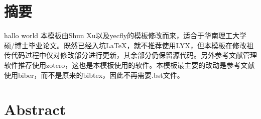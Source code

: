 \chapter{摘\texorpdfstring{\quad}{}要}
	hallo world
	本模板由Shun Xu\cite{_}以及yecfly\cite{_a}的模板修改而来，适合于华南理工大学硕/博士毕业论文。既然已经入坑LaTeX，就不推荐使用LYX，但本模板在修改祖传代码过程中仅对修改部分进行更新，其余部分仍保留源代码。另外参考文献管理软件推荐使用zotero，这也是本模板使用的软件。本模板最主要的改动是参考文献使用biber，而不是原来的bibtex，因此不再需要.bst文件。


\chapter{Abstract}
	

